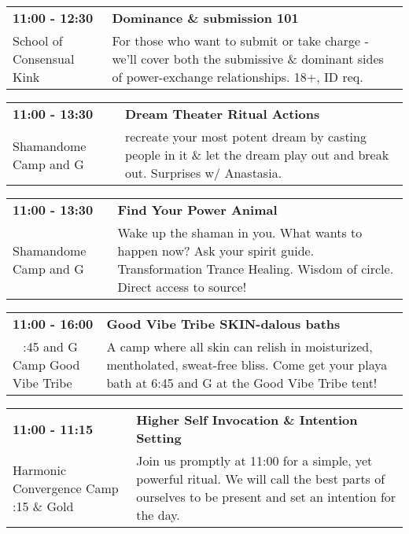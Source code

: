 \begin{tabular}{ p{1in} p{2.2in} }
    \textbf{11:00 - 12:30} & \textbf{Dominance \& submission 101} \\
    School of Consensual Kink \newline  & For those who want to submit or take charge - we'll cover both the submissive \& dominant sides of power-exchange relationships. 18+, ID req. \\
    \hline 
\end{tabular}
    
\begin{tabular}{ p{1in} p{2.2in} }
    \textbf{11:00 - 13:30} & \textbf{Dream Theater Ritual Actions} \\
    Shamandome Camp \newline 615 and G & recreate your most potent dream by casting people in it \& let the dream play out and break out. Surprises w/ Anastasia. \\
    \hline 
\end{tabular}
    
\begin{tabular}{ p{1in} p{2.2in} }
    \textbf{11:00 - 13:30} & \textbf{Find Your Power Animal} \\
    Shamandome Camp \newline 615 and G & Wake up the shaman in you. What wants to happen now? Ask your spirit guide. Transformation Trance Healing. Wisdom of circle. Direct access to source! \\
    \hline 
\end{tabular}
    
\begin{tabular}{ p{1in} p{2.2in} }
    \textbf{11:00 - 16:00} & \textbf{Good Vibe Tribe SKIN-dalous baths} \\
    ~ \newline 6:45 and G Camp Good Vibe Tribe & A camp where all skin can relish in moisturized, mentholated, sweat-free bliss. Come get your playa bath at 6:45 and G at the Good Vibe Tribe tent! \\
    \hline 
\end{tabular}
    
\begin{tabular}{ p{1in} p{2.2in} }
    \textbf{11:00 - 11:15} & \textbf{Higher Self Invocation \& Intention Setting} \\
    Harmonic Convergence Camp \newline 4:15 \& Gold & Join us promptly at 11:00 for a simple, yet powerful ritual.  We will call the best parts of ourselves to be present and set an intention for the day. \\
    \hline 
\end{tabular}
    
